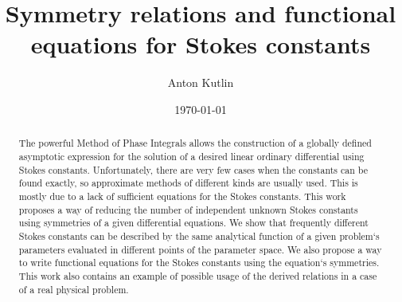 \documentclass[aps,prl,preprint,superscriptaddress]{revtex4}
\begin{document}

\title{Symmetry relations and functional equations for Stokes constants}


\author{Anton Kutlin}


\date{\today}

\begin{abstract}
The powerful Method of Phase Integrals allows the construction of a globally defined asymptotic expression for the solution of a desired linear ordinary differential using Stokes constants. Unfortunately, there are very few cases when the constants can be found exactly, so approximate methods of different kinds \cite{white,ours} are usually used. This is mostly due to a lack of sufficient equations for the Stokes constants. This work proposes a way of reducing the number of independent unknown Stokes constants using symmetries of a given differential equations. We show that frequently different Stokes constants can be described by the same analytical function of a given problem`s parameters evaluated in different points of the parameter space.  We also propose a way to write functional equations for the Stokes constants using the equation`s symmetries. This work also contains an example of possible usage of the derived relations in a case of a real physical problem.
\end{abstract}
\end{document}
